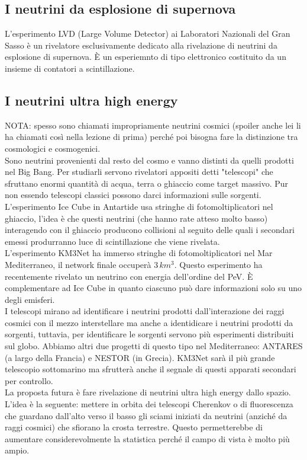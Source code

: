 \documentclass[11pt, oneside]{article}   	%
\begin{document}

\subsection{I neutrini da esplosione di supernova}
L'esperimento LVD (Large Volume Detector) ai Laboratori Nazionali del Gran Sasso è un rivelatore esclusivamente dedicato alla rivelazione di neutrini da esplosione di supernova.  È un esperiemnto di tipo elettronico costituito da un insieme di contatori a scintillazione. 

\subsection{I neutrini ultra high energy}
NOTA: spesso sono chiamati impropriamente neutrini cosmici (spoiler anche lei li ha chiamati così nella lezione di prima) perché poi bisogna fare la distinzione tra cosmologici e cosmogenici. \\Sono neutrini provenienti dal resto del cosmo e vanno distinti da quelli prodotti nel Big Bang. 
Per studiarli servono rivelatori appositi detti "telescopi" che sfruttano enormi quantità di acqua, terra o ghiaccio come target massivo. Pur non essendo telescopi classici possono darci informazioni sulle sorgenti. \\
L'esperimento Ice Cube in Antartide usa stringhe di fotomoltiplicatori nel ghiaccio, l'idea è che questi neutrini (che hanno rate atteso molto basso) interagendo con il ghiaccio producono collisioni al seguito delle quali i secondari emessi produrranno luce di scintillazione che viene rivelata.\\
L'esperimento KM3Net ha immerso stringhe di fotomoltiplicatori nel Mar Mediterraneo, il network finale occuperà $3\, km^3$. Questo esperimento ha recentemente rivelato un neutrino con energia dell'ordine del PeV. È complementare ad Ice Cube in quanto ciascuno può dare informazioni solo su uno degli emisferi. \\
I telescopi mirano ad identificare i neutrini prodotti dall'interazione dei raggi cosmici con il mezzo interstellare ma anche a identidicare i neutrini prodotti da sorgenti, tuttavia, per identificare le sorgenti servono più esperimenti distribuiti sul globo. Abbiamo altri due progetti di questo tipo nel Mediterraneo: ANTARES (a largo della Francia) e NESTOR (in Grecia). KM3Net sarà il più grande telescopio sottomarino ma sfrutterà anche il segnale di questi apparati secondari per controllo. \\
La proposta futura è fare rivelazione di neutrini ultra high energy dallo spazio. L'idea è la seguente: mettere in orbita dei telescopi Cherenkov o di fluorescenza che guardano dall'alto verso il basso gli sciami iniziati da neutrini (anziché da raggi cosmici) che sfiorano la crosta terrestre. Questo permetterebbe di aumentare considerevolmente la statistica perché il campo di vista è molto più ampio. 
\end{document}
